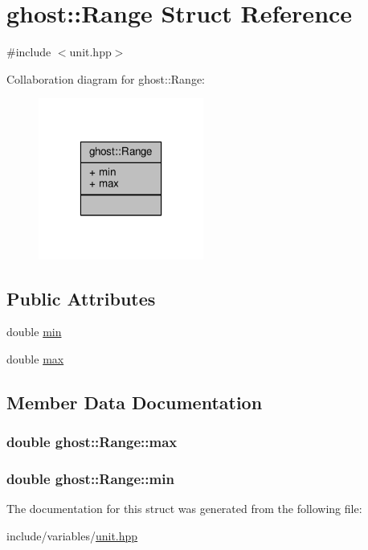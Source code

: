 \hypertarget{structghost_1_1Range}{\section{ghost\-:\-:Range Struct Reference}
\label{structghost_1_1Range}
}


{\ttfamily \#include $<$unit.\-hpp$>$}



Collaboration diagram for ghost\-:\-:Range\-:
\nopagebreak
\begin{figure}[H]
\begin{center}
\leavevmode
\includegraphics[width=154pt]{structghost_1_1Range__coll__graph}
\end{center}
\end{figure}
\subsection*{Public Attributes}
\begin{DoxyCompactItemize}
\item 
double \hyperlink{structghost_1_1Range_ad35b5ebdd4f72b7cafd7eacd3051c305}{min}
\item 
double \hyperlink{structghost_1_1Range_afc9dfa0ad6e7f7728a3e1474adce776d}{max}
\end{DoxyCompactItemize}


\subsection{Member Data Documentation}
\hypertarget{structghost_1_1Range_afc9dfa0ad6e7f7728a3e1474adce776d}{
\subsubsection[{max}]{\setlength{\rightskip}{0pt plus 5cm}double ghost\-::\-Range\-::max}}\label{structghost_1_1Range_afc9dfa0ad6e7f7728a3e1474adce776d}
\hypertarget{structghost_1_1Range_ad35b5ebdd4f72b7cafd7eacd3051c305}{
\subsubsection[{min}]{\setlength{\rightskip}{0pt plus 5cm}double ghost\-::\-Range\-::min}}\label{structghost_1_1Range_ad35b5ebdd4f72b7cafd7eacd3051c305}


The documentation for this struct was generated from the following file\-:\begin{DoxyCompactItemize}
\item 
include/variables/\hyperlink{unit_8hpp}{unit.\-hpp}\end{DoxyCompactItemize}
